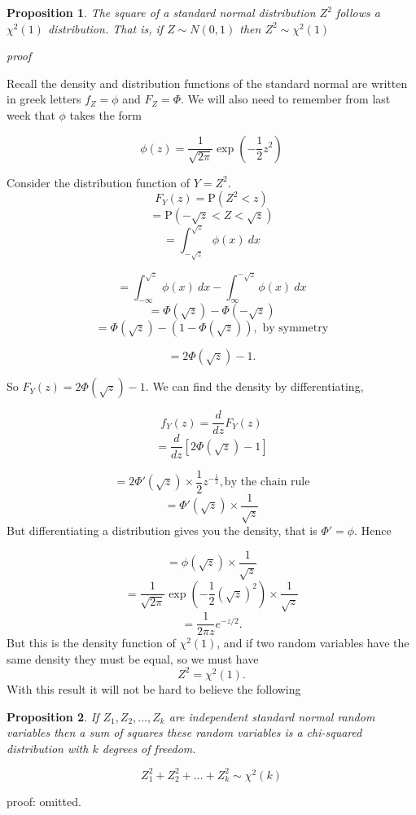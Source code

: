 \documentclass[
]{book}
\newtheorem{proposition}{Proposition}[chapter]
\theoremstyle{definition}
\theoremstyle{definition}
\theoremstyle{definition}
\theoremstyle{definition}
\theoremstyle{remark}
\begin{document}
\begin{proposition}
The square of a standard normal distribution \(Z^2\) follows a \(\chi^2(1)\) distribution. That is, if \(Z\sim N(0,1)\) then \(Z^2\sim \chi^2(1)\)
\end{proposition}

\emph{proof}

Recall the density and distribution functions of the standard normal are written in greek letters \(f_Z = \phi\) and \(F_Z = \Phi\). We will also need to remember from last week that \(\phi\) takes the form

\[\phi(z) =  \frac{1}{\sqrt{2\pi}} \exp \left( -\frac{1}{2}z^2 \right)\]

Consider the distribution function of \(Y=Z^2\).
\[ F_Y(z) = \text{P}(Z^2<z)\]
\[= \text{P}\left(-\sqrt{z}<Z<\sqrt{z}\right)\]
\[=\int_{-\sqrt{z}}^{\sqrt{z}}\phi(x) \ dx \]

\[=\int_{-\infty}^{\sqrt{z}}\phi(x) \ dx - \int_{\infty}^{-\sqrt{z}}\phi(x) \ dx\]
\[=\Phi(\sqrt{z})- \Phi(-\sqrt{z})\]
\[=\Phi(\sqrt{z})-(1-\Phi(\sqrt{z})), \text{ by symmetry}\]

\[=2\Phi(\sqrt{z})-1. \]

So \(F_Y(z) = 2\Phi(\sqrt{z})-1\). We can find the density by differentiating,

\[f_Y (z)= \frac{d}{dz}F_Y(z)\]
\[=\frac{d}{dz}\left[2\Phi(\sqrt{z})-1\right] \]

\[=2\Phi'(\sqrt{z})\times\frac{1}{2}z^{-\frac{1}{2}} , \text{by the chain rule}\]
\[=\Phi'(\sqrt{z})\times\frac{1}{\sqrt{z}}\]
But differentiating a distribution gives you the density, that is \(\Phi' = \phi\). Hence

\[=\phi(\sqrt{z})\times\frac{1}{\sqrt{z}}\]
\[=\frac{1}{\sqrt{2\pi}} \exp \left( -\frac{1}{2}(\sqrt{z})^2 \right) \times \frac{1}{\sqrt{z}}\]
\[=\frac{1}{2\pi z} e^{-z/2}. \]
But this is the density function of \(\chi^2(1)\), and if two random variables have the same density they must be equal, so we must have
\[Z^2 = \chi^2(1).\]
With this result it will not be hard to believe the following

\begin{proposition}
If \(Z_1 ,Z_2, \ldots, Z_k\) are independent standard normal random variables then a sum of squares these random variables is a chi-squared distribution with \(k\) degrees of freedom.

\[Z_1^2+Z_2^2+\ldots+ Z_k^2 \sim \chi^2(k) \]
\end{proposition}

proof: omitted.
\end{document}
